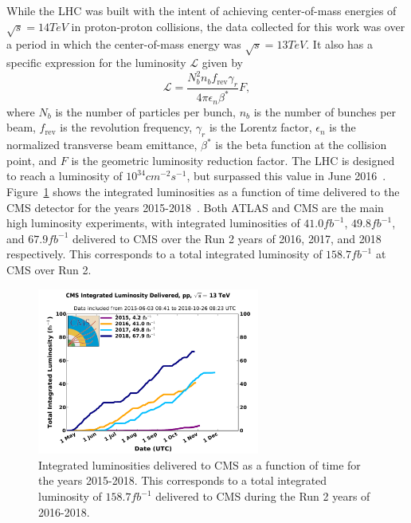 While the LHC was built with the intent of achieving center-of-mass energies of $\sqrt{s}=14\unit{TeV}$ in proton-proton collisions, the data collected for this work was over a period in which the center-of-mass energy was $\sqrt{s}=13\unit{TeV}$.
It also has a specific expression for the luminosity $\mathcal{L}$ given by
\begin{equation}
  \mathcal{L}=\frac{N_b^2n_bf_\mathrm{rev}\gamma_r}{4\pi\epsilon_n\beta^*}F,
\end{equation}
where $N_b$ is the number of particles per bunch, $n_b$ is the number of bunches per beam, $f_\mathrm{rev}$ is the revolution frequency, $\gamma_r$ is the Lorentz factor, $\epsilon_n$ is the normalized transverse beam emittance, $\beta^*$ is the beta function at the collision point, and $F$ is the geometric luminosity reduction factor.
The LHC is designed to reach a luminosity of $10^{34}\unit{cm^{-2}s^{-1}}$, but surpassed this value in June 2016~\cite{LHClumi}.
Figure~\ref{fig:CMSlumi} shows the integrated luminosities as a function of time delivered to the CMS detector for the years 2015-2018~\cite{CMSlumi}.
Both ATLAS and CMS are the main high luminosity experiments, with integrated luminosities of $41.0\unit{fb^{-1}}$, $49.8\unit{fb^{-1}}$, and $67.9\unit{fb^{-1}}$ delivered to CMS over the Run 2 years of 2016, 2017, and 2018 respectively.
This corresponds to a total integrated luminosity of $158.7\unit{fb^{-1}}$ at CMS over Run 2.


\begin{figure}[htbp]
  \centering
  \includegraphics[width=0.65\textwidth]{fig/experiment/int_lumi_cumulative_pp_2_run2.pdf}
  \caption{
    Integrated luminosities delivered to CMS as a function of time for the years 2015-2018.
    This corresponds to a total integrated luminosity of $158.7\unit{fb^{-1}}$ delivered to CMS during the Run 2 years of 2016-2018.
  }
  \label{fig:CMSlumi}
\end{figure}

